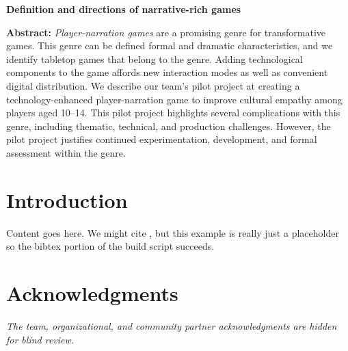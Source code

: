 \documentclass[a4paper]{article}
\newcommand{\projecttitle}{Definition and directions of narrative-rich games}
\begin{document}
\begin{center}
\fontsize{14}{16.8}\selectfont
\bf \projecttitle
\end{center}

\vspace{-0.25in}
\begin{center}
\iftoggle{blind}{
}{
Paul Gestwicki, others, Ball State University\\
pvgestwicki@bsu.edu\\
}
\end{center}


%
\begin{adjustwidth}{0.5in}{0.5in}
  \textbf{Abstract:} \textit{Player-narration games} are a promising
  genre for transformative games. This genre can be defined formal and
  dramatic characteristics, and we identify tabletop games that belong
  to the genre.  Adding technological components to the game affords
  new interaction modes as well as convenient digital distribution. We
  describe our team's pilot project at creating a technology-enhanced
  player-narration game to improve cultural empathy among players aged
  10--14.  This pilot project highlights several complications with
  this genre, including thematic, technical, and production
  challenges.  However, the pilot project justifies continued
  experimentation, development, and formal assessment within the
  genre.
\end{adjustwidth}

\section{Introduction}

Content goes here.
We might cite \citet{Koster2013}, but this example is really just a placeholder
so the bibtex portion of the build script succeeds.


\section{Acknowledgments}
\textit{The team, organizational, and community partner
  acknowledgments are hidden for blind review.}



\end{document}
